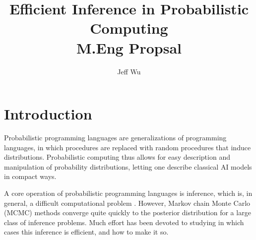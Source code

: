 \documentclass[11pt]{article}
\begin{document}
\title{{\bf Efficient Inference in Probabilistic Computing} \\ M.Eng Propsal}
\author{Jeff Wu}
\date{}
\maketitle
%




\begin{abstract}
\end{abstract}

\section{Introduction}

Probabilistic programming languages are generalizations of programming languages, in which procedures are replaced with random procedures that induce distributions.  Probabilistic computing thus allows for easy description and manipulation of probability distributions, letting one describe classical AI models in compact ways.  

A core operation of probabilistic programming languages is inference, which is, in general, a difficult computational problem \cite{?}.  However, Markov chain Monte Carlo (MCMC) methods converge quite quickly to the posterior distribution for a large class of inference problems.  Much effort has been devoted to studying in which cases this inference is efficient, and how to make it so.  






\end{document}
